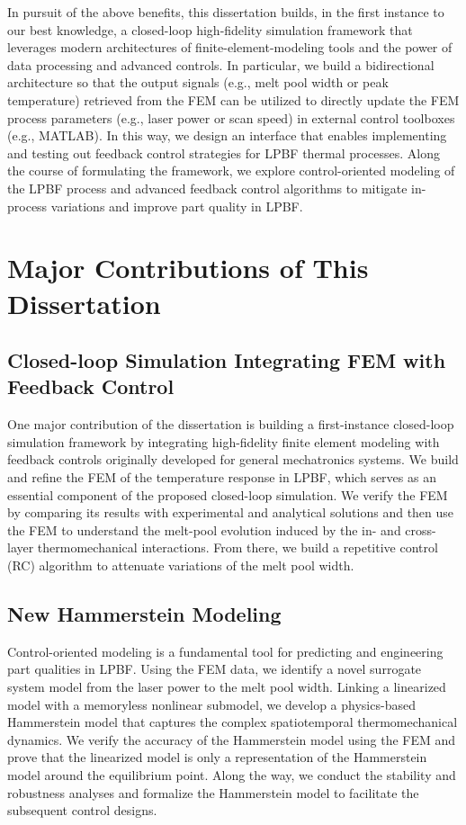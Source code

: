 \documentclass [11pt, proquest] {uwthesis}[2020/02/24]
\begin{document}
In pursuit of the above benefits, this dissertation builds, in the first
instance to our best knowledge, a closed-loop high-fidelity simulation
framework that leverages modern architectures of finite-element-modeling
tools and the power of data processing and advanced controls. In particular,
we build a bidirectional architecture so that the output signals (e.g.,
melt pool width or peak temperature) retrieved from the FEM can be
utilized to directly update the FEM process parameters (e.g., laser
power or scan speed) in external control toolboxes (e.g., MATLAB).
In this way, we design an interface that enables implementing
and testing out feedback control strategies for LPBF thermal processes. Along the course of formulating the framework, we explore control-oriented modeling of the LPBF process and advanced feedback control algorithms to mitigate in-process variations and improve part quality in LPBF.

\section*{Major Contributions of This Dissertation}

\subsection*{Closed-loop Simulation Integrating FEM with Feedback Control}
One major contribution of the dissertation is building a first-instance
closed-loop simulation framework by integrating high-fidelity finite
element modeling with feedback controls originally developed for general
mechatronics systems. We build and refine the FEM of the temperature response in LPBF, which serves as an essential component of the proposed closed-loop simulation. We verify the FEM by comparing its results with experimental
and analytical solutions and then use the FEM to understand the melt-pool
evolution induced by the in- and cross-layer thermomechanical interactions.
From there, we build a repetitive control (RC) algorithm to attenuate variations
of the melt pool width.

\subsection*{New Hammerstein Modeling}
Control-oriented modeling is a fundamental tool
for predicting and engineering part qualities in LPBF. Using
the FEM data, we identify a novel surrogate system model from the
laser power to the melt pool width. Linking a linearized model with
a memoryless nonlinear submodel, we develop a physics-based Hammerstein
model that captures the complex spatiotemporal thermomechanical dynamics.
We verify the accuracy of the Hammerstein model using the FEM and
prove that the linearized model is only a representation of the Hammerstein
model around the equilibrium point. Along the way, we conduct the
stability and robustness analyses and formalize the Hammerstein model
to facilitate the subsequent control designs.
\end{document}
